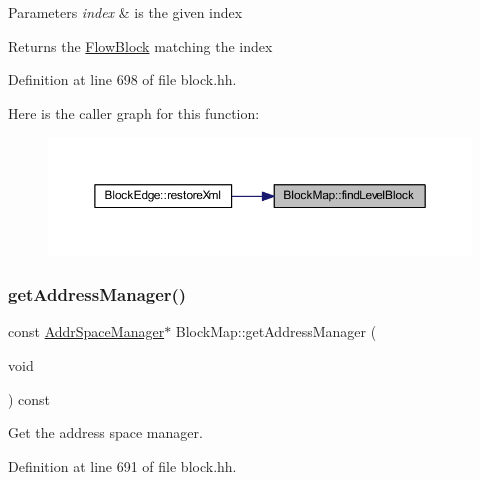 \begin{DoxyParams}{Parameters}
{\em index} & is the given index \\
\hline
\end{DoxyParams}
\begin{DoxyReturn}{Returns}
the \mbox{\hyperlink{class_flow_block}{Flow\+Block}} matching the index 
\end{DoxyReturn}


Definition at line 698 of file block.\+hh.

Here is the caller graph for this function\+:
\nopagebreak
\begin{figure}[H]
\begin{center}
\leavevmode
\includegraphics[width=350pt]{class_block_map_abc5d592bf94c4e29c6a0efbcd1890883_icgraph}
\end{center}
\end{figure}
\mbox{\label{class_block_map_ae320132fd4805cb28efb2c02f7d2e3a7}} 
\subsubsection{\texorpdfstring{getAddressManager()}{getAddressManager()}}
{\footnotesize\ttfamily const \mbox{\hyperlink{class_addr_space_manager}{Addr\+Space\+Manager}}$\ast$ Block\+Map\+::get\+Address\+Manager (\begin{DoxyParamCaption}\item[{void}]{ }\end{DoxyParamCaption}) const\hspace{0.3cm}{\ttfamily [inline]}}



Get the address space manager. 



Definition at line 691 of file block.\+hh.

